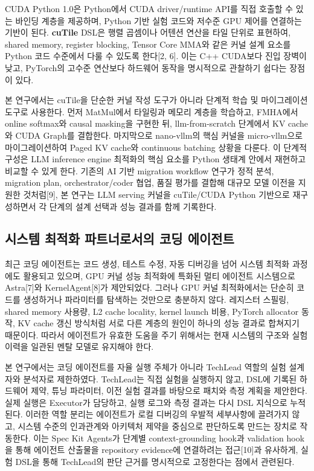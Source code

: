 \documentclass{kcc} %
\begin{document}
CUDA Python 1.0은 Python에서 CUDA driver/runtime API를 직접 호출할 수 있는 바인딩 계층을 제공하며, Python 기반 실험 코드와 저수준 GPU 제어를 연결하는 기반이 된다. \textbf{cuTile} DSL은 행렬 곱셈이나 어텐션 연산을 타일 단위로 표현하여, shared memory, register blocking, Tensor Core MMA와 같은 커널 설계 요소를 Python 코드 수준에서 다룰 수 있도록 한다[2, 6]. 이는 C++ CUDA보다 진입 장벽이 낮고, PyTorch의 고수준 연산보다 하드웨어 동작을 명시적으로 관찰하기 쉽다는 장점이 있다.


본 연구에서는 cuTile을 단순한 커널 작성 도구가 아니라 단계적 학습 및 마이그레이션 도구로 사용한다. 먼저 MatMul에서 타일링과 메모리 계층을 학습하고, FMHA에서 online softmax와 causal masking을 구현한 뒤, llm-from-scratch 단계에서 KV cache와 CUDA Graph를 결합한다. 마지막으로 nano-vllm의 핵심 커널을 micro-vllm으로 마이그레이션하여 Paged KV cache와 continuous batching 상황을 다룬다. 이 단계적 구성은 LLM inference engine 최적화의 핵심 요소를 Python 생태계 안에서 재현하고 비교할 수 있게 한다. 기존의 AI 기반 migration workflow 연구가 정적 분석, migration plan, orchestrator/coder 협업, 품질 평가를 결합해 대규모 모델 이전을 지원한 것처럼[9], 본 연구는 LLM serving 커널을 cuTile/CUDA Python 기반으로 재구성하면서 각 단계의 설계 선택과 성능 결과를 함께 기록한다.


\subsection{시스템 최적화 파트너로서의 코딩 에이전트}

최근 코딩 에이전트는 코드 생성, 테스트 수정, 자동 디버깅을 넘어 시스템 최적화 과정에도 활용되고 있으며, GPU 커널 성능 최적화에 특화된 멀티 에이전트 시스템으로 Astra[7]와 KernelAgent[8]가 제안되었다. 그러나 GPU 커널 최적화에서는 단순히 코드를 생성하거나 파라미터를 탐색하는 것만으로 충분하지 않다. 레지스터 스필링, shared memory 사용량, L2 cache locality, kernel launch 비용, PyTorch allocator 동작, KV cache 갱신 방식처럼 서로 다른 계층의 원인이 하나의 성능 결과로 합쳐지기 때문이다. 따라서 에이전트가 유효한 도움을 주기 위해서는 현재 시스템의 구조와 실험 이력을 일관된 멘탈 모델로 유지해야 한다.


본 연구에서는 코딩 에이전트를 자율 실행 주체가 아니라 TechLead 역할의 실험 설계자와 분석자로 제한하였다. TechLead는 직접 실험을 실행하지 않고, DSL에 기록된 하드웨어 제약, 튜닝 파라미터, 이전 실험 결과를 바탕으로 패치와 측정 계획을 제안한다. 실제 실행은 Executor가 담당하고, 실행 로그와 측정 결과는 다시 DSL 지식으로 누적된다. 이러한 역할 분리는 에이전트가 로컬 디버깅의 우발적 세부사항에 끌려가지 않고, 시스템 수준의 인과관계와 아키텍처 제약을 중심으로 판단하도록 만드는 장치로 작동한다. 이는 Spec Kit Agents가 단계별 context-grounding hook과 validation hook을 통해 에이전트 산출물을 repository evidence에 연결하려는 접근[10]과 유사하게, 실험 DSL을 통해 TechLead의 판단 근거를 명시적으로 고정한다는 점에서 관련된다.
\end{document}
